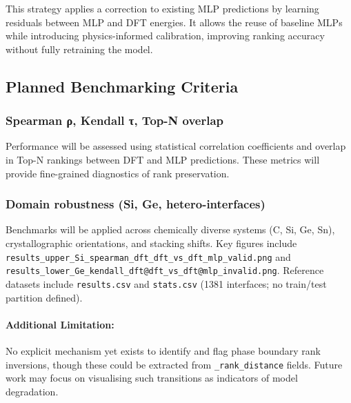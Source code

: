 This strategy applies a correction to existing MLP predictions by learning residuals between MLP and DFT energies. It allows the reuse of baseline MLPs while introducing physics-informed calibration, improving ranking accuracy without fully retraining the model.


\subsection{Planned Benchmarking Criteria}

\subsubsection{Spearman ρ, Kendall τ, Top-N overlap}

Performance will be assessed using statistical correlation coefficients and overlap in Top-N rankings between DFT and MLP predictions. These metrics will provide fine-grained diagnostics of rank preservation.


\subsubsection{Domain robustness (Si, Ge, hetero-interfaces)}

Benchmarks will be applied across chemically diverse systems (C, Si, Ge, Sn), crystallographic orientations, and stacking shifts. Key figures include \texttt{results\_upper\_Si\_spearman\_dft\_dft\_vs\_dft\_mlp\_valid.png} and \texttt{results\_lower\_Ge\_kendall\_dft@dft\_vs\_dft@mlp\_invalid.png}. Reference datasets include \texttt{results.csv} and \texttt{stats.csv} (1381 interfaces; no train/test partition defined).

\paragraph{Additional Limitation:}

No explicit mechanism yet exists to identify and flag phase boundary rank inversions, though these could be extracted from \texttt{\_rank\_distance} fields. Future work may focus on visualising such transitions as indicators of model degradation.


